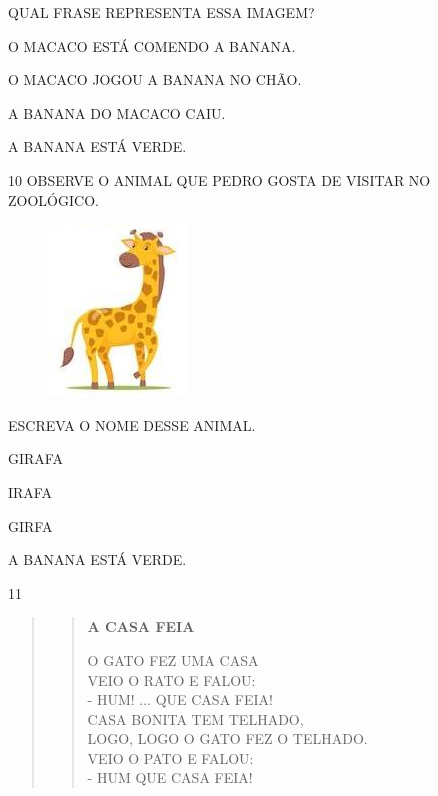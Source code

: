 QUAL FRASE REPRESENTA ESSA IMAGEM?

\begin{escolha}
\item O MACACO ESTÁ COMENDO A BANANA.

\item O MACACO JOGOU A BANANA NO CHÃO.

\item A BANANA DO MACACO CAIU.

\item A BANANA ESTÁ VERDE.
\end{escolha}

\pagebreak
\num{10} OBSERVE O ANIMAL QUE PEDRO GOSTA DE VISITAR NO ZOOLÓGICO.

\begin{figure}[htpb]
\centering
\includegraphics[width=.3\textwidth]{media/image219.jpg}
\end{figure}

ESCREVA O NOME DESSE ANIMAL.

\begin{escolha}
\item GIRAFA

\item IRAFA

\item GIRFA

\item A BANANA ESTÁ VERDE.
\end{escolha}

\num{11}

\begin{quote}
\begin{verse}
\textbf{A CASA FEIA}

O GATO FEZ UMA CASA\\
VEIO O RATO E FALOU:\\
- HUM! ... QUE CASA FEIA!\\
CASA BONITA TEM TELHADO,\\
LOGO, LOGO O GATO FEZ O TELHADO.\\
VEIO O PATO E FALOU:\\
- HUM QUE CASA FEIA!
\end{verse}
\end{quote}

